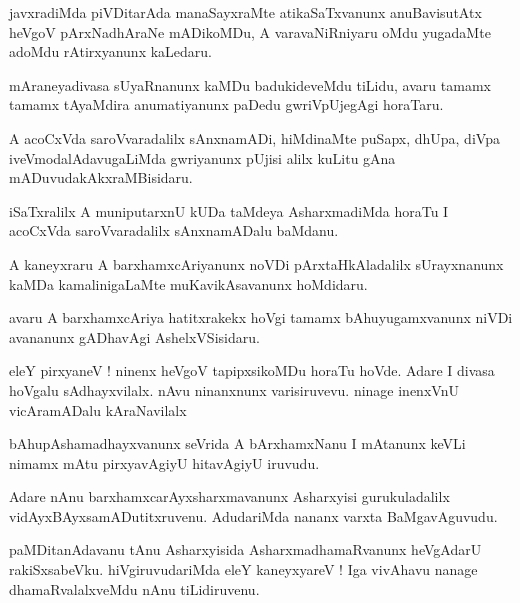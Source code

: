 \documentclass{article}
\begin{document}
\begin{mn}
javxradiMda piVDitarAda manaSayxraMte atikaSaTxvanunx anuBavisutAtx heVgoV pArxNadhAraNe mADikoMDu,
A varavaNiRniyaru oMdu yugadaMte adoMdu rAtirxyanunx kaLedaru.
\end{mn}

\begin{mn}
mAraneyadivasa sUyaRnanunx kaMDu badukideveMdu tiLidu, avaru tamamx tamamx tAyaMdira 
anumatiyanunx paDedu gwriVpUjegAgi horaTaru.
\end{mn}

\begin{mn}
A acoCxVda saroVvaradalilx sAnxnamADi, hiMdinaMte puSapx, dhUpa, diVpa iveVmodalAdavugaLiMda 
gwriyanunx  pUjisi alilx kuLitu gAna mADuvudakAkxraMBisidaru.
\end{mn}

\begin{mn}
iSaTxralilx A muniputarxnU kUDa taMdeya AsharxmadiMda horaTu I acoCxVda saroVvaradalilx sAnxnamADalu
baMdanu.
\end{mn}

\begin{mn}
A kaneyxraru A barxhamxcAriyanunx noVDi pArxtaHkAladalilx sUrayxnanunx kaMDa kamalinigaLaMte 
muKavikAsavanunx hoMdidaru.
\end{mn}

\begin{mn}
avaru A barxhamxcAriya hatitxrakekx hoVgi tamamx bAhuyugamxvanunx niVDi avananunx gADhavAgi 
AshelxVSisidaru.
\end{mn}

\begin{mn}
eleY pirxyaneV ! ninenx heVgoV tapipxsikoMDu horaTu hoVde. Adare I divasa hoVgalu sAdhayxvilalx. 
nAvu ninanxnunx varisiruvevu. ninage inenxVnU vicAramADalu kAraNavilalx
\end{mn}

\begin{mn}
bAhupAshamadhayxvanunx seVrida A bArxhamxNanu I mAtanunx keVLi nimamx mAtu pirxyavAgiyU 
hitavAgiyU iruvudu.
\end{mn}

\begin{mn}
Adare nAnu barxhamxcarAyxsharxmavanunx Asharxyisi gurukuladalilx vidAyxBAyxsamADutitxruvenu. 
AdudariMda nananx varxta BaMgavAguvudu.
\end{mn}

\begin{mn}
paMDitanAdavanu tAnu Asharxyisida AsharxmadhamaRvanunx heVgAdarU rakiSxsabeVku. hiVgiruvudariMda 
eleY kaneyxyareV ! Iga vivAhavu nanage dhamaRvalalxveMdu nAnu tiLidiruvenu.
\end{mn}
\end{document}
